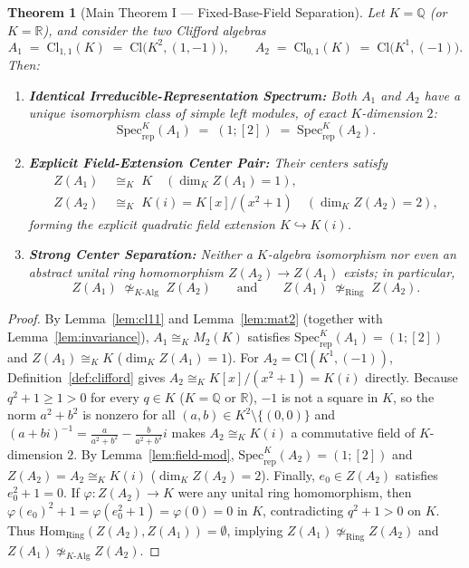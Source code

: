 \documentclass[11pt,a4paper]{article}
\theoremstyle{plain}
\newtheorem{theorem}{Theorem}[section]
\theoremstyle{definition}
\newcommand{\Cl}{\mathrm{Cl}}
\newcommand{\Specrep}{\mathrm{Spec}_{\mathrm{rep}}}
\newcommand{\Mat}{M}
\newcommand{\Q}{\mathbb{Q}}
\newcommand{\R}{\mathbb{R}}
\begin{document}
\begin{theorem}[Main Theorem I --- Fixed-Base-Field Separation]\label{thm:regime-I}
Let $K = \Q$ (or $K = \R$), and consider the two Clifford algebras
\[
  A_1 \;=\; \Cl_{1,1}(K) \;=\; \Cl\bigl(K^2, (1,-1)\bigr),
  \qquad
  A_2 \;=\; \Cl_{0,1}(K) \;=\; \Cl\bigl(K^1, (-1)\bigr).
\]
Then:
\begin{enumerate}
  \item \textbf{Identical Irreducible-Representation Spectrum:} Both $A_1$ and $A_2$ have a unique isomorphism class of simple left modules, of exact $K$-dimension $2$:
  \[
    \Specrep^K(A_1) \;=\; (1;[2]) \;=\; \Specrep^K(A_2).
  \]
  \item \textbf{Explicit Field-Extension Center Pair:} Their centers satisfy
  \begin{align*}
    Z(A_1) &\;\cong_K\; K \quad (\dim_K Z(A_1) = 1), \\
    Z(A_2) &\;\cong_K\; K(i) = K[x]/(x^2+1) \quad (\dim_K Z(A_2) = 2),
  \end{align*}
  forming the explicit quadratic field extension $K \hookrightarrow K(i)$.
  \item \textbf{Strong Center Separation:} Neither a $K$-algebra isomorphism nor even an abstract unital ring homomorphism $Z(A_2) \to Z(A_1)$ exists; in particular,
  \[
    Z(A_1) \;\not\simeq_{K\text{-}\mathrm{Alg}}\; Z(A_2)
    \qquad\text{and}\qquad
    Z(A_1) \;\not\simeq_{\mathrm{Ring}}\; Z(A_2).
  \]
\end{enumerate}
\end{theorem}

\begin{proof}
By Lemma~\ref{lem:cl11} and Lemma~\ref{lem:mat2} (together with Lemma~\ref{lem:invariance}), $A_1 \cong_K \Mat_2(K)$ satisfies $\Specrep^K(A_1) = (1;[2])$ and $Z(A_1) \cong_K K$ ($\dim_K Z(A_1) = 1$). For $A_2 = \Cl(K^1,(-1))$, Definition~\ref{def:clifford} gives $A_2 \cong_K K[x]/(x^2+1) = K(i)$ directly. Because $q^2 + 1 \ge 1 > 0$ for every $q \in K$ ($K = \Q$ or $\R$), $-1$ is not a square in $K$, so the norm $a^2 + b^2$ is nonzero for all $(a,b) \in K^2 \setminus \{(0,0)\}$ and $(a+bi)^{-1} = \frac{a}{a^2+b^2} - \frac{b}{a^2+b^2} i$ makes $A_2 \cong_K K(i)$ a commutative field of $K$-dimension $2$. By Lemma~\ref{lem:field-mod}, $\Specrep^K(A_2) = (1;[2])$ and $Z(A_2) = A_2 \cong_K K(i)$ ($\dim_K Z(A_2) = 2$). Finally, $e_0 \in Z(A_2)$ satisfies $e_0^2 + 1 = 0$. If $\varphi : Z(A_2) \to K$ were any unital ring homomorphism, then $\varphi(e_0)^2 + 1 = \varphi(e_0^2 + 1) = \varphi(0) = 0$ in $K$, contradicting $q^2 + 1 > 0$ on $K$. Thus $\mathrm{Hom}_{\mathrm{Ring}}(Z(A_2), Z(A_1)) = \emptyset$, implying $Z(A_1) \not\simeq_{\mathrm{Ring}} Z(A_2)$ and $Z(A_1) \not\simeq_{K\text{-}\mathrm{Alg}} Z(A_2)$.
\end{proof}
\end{document}
